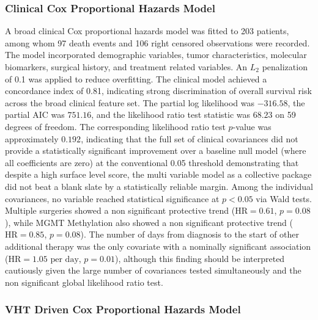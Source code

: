 \subsubsection{Clinical Cox Proportional Hazards Model}

A broad clinical Cox proportional hazards model was fitted to 203 patients, among whom 97 death events and 106 right censored observations were recorded. The model incorporated demographic variables, tumor characteristics, molecular biomarkers, surgical history, and treatment related variables. An $L_2$ penalization of 0.1 was applied to reduce overfitting. The clinical model achieved a concordance index of 0.81, indicating strong discrimination of overall survival risk across the broad clinical feature set. The partial log likelihood was $-316.58$, the partial AIC was $751.16$, and the likelihood ratio test statistic was $68.23$ on 59 degrees of freedom. The corresponding likelihood ratio test $p$-value was approximately $0.192$, indicating that the full set of clinical covariances did not provide a statistically significant improvement over a baseline null model (where all coefficients are zero) at the conventional 0.05 threshold demonstrating that despite a high surface level score, the multi variable model as a collective package did not beat a blank slate by a statistically reliable margin. Among the individual covariances, no variable reached statistical significance at $p < 0.05$ via Wald tests. Multiple surgeries showed a non significant protective trend ($\text{HR} = 0.61$, $p = 0.08$), while MGMT Methylation also showed a non significant protective trend ($\text{HR} = 0.85$, $p = 0.08$). The number of days from diagnosis to the start of other additional therapy was the only covariate with a nominally significant association ($\text{HR} = 1.05\text{ per day}$, $p = 0.01$), although this finding should be interpreted cautiously given the large number of covariances tested simultaneously and the non significant global likelihood ratio test.

\subsubsection{VHT Driven Cox Proportional Hazards Model}

